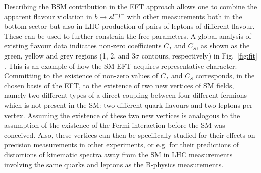 Describing the BSM contribution in the EFT approach allows one to
combine the apparent flavour violation in $b \to sl^+l^-$ with other
measurements both in the bottom sector but also in LHC production of
pairs of leptons of different flavour. These can be used
to further constrain the free parameters.  A global analysis of
existing flavour data \citep[see, e.g.,][]{Albrecht:2018frt} indicates
non-zero coefficients $C_T$ and $C_S$, as shown as the green, yellow
and grey regions (1, 2, and 3$\sigma$ contours, respectively) in
Fig.~\ref{fig:fit} \citep{Buttazzo:2017ixm}.  This is an example of
how the SM-EFT acquires representative character: Committing to the
existence of non-zero values of $C_T$ and $C_S$ corresponds, in the
chosen basis of the EFT, to the existence of two new vertices of SM
fields, namely two different types of a direct coupling between four
different fermions which is not present in the SM: two different
quark flavours and two leptons per vertex. Assuming the existence of
these two new vertices is analogous to the assumption of the existence
of the Fermi interaction before the SM was conceived. Also, these
vertices can then be specifically studied for their effects on
precision measurements in other experiments, or e.g.{} for their
predictions of distortions of kinematic spectra away from the SM in
LHC measurements involving the same quarks and leptons as the
B-physics measurements.
